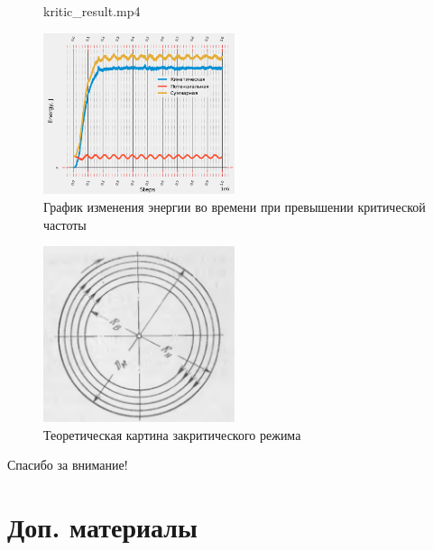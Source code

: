 \documentclass[c]{beamer}  %
\begin{document}
\begin{frame}
\frametitle{\insertsection} 
\framesubtitle{\insertsubsection}
\begin{figure}[ht]
     		{kritic_result.mp4}
\end{figure}
 {
\begin{figure}[H]
	\centering
	\includegraphics[width=0.5\textwidth]{kritic_energy} 
	\caption{График изменения энергии во времени при превышении критической частоты}
\end{figure}
}
{
\begin{figure}[H]
	\centering
	\includegraphics[width=0.5\textwidth]{kritic_theory} 
	\caption{Теоретическая картина закритического режима}
\end{figure}
}
\end{frame}


\begin{frame}
\centering
Спасибо за внимание!
\end{frame}

\section{Доп. материалы}
\end{document}
